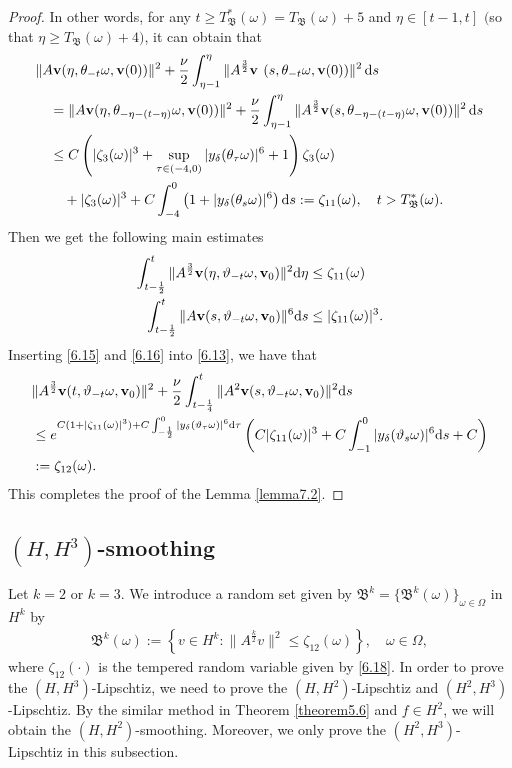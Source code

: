 \documentclass{elsarticle}
\theoremstyle{definition}
\numberwithin{equation}{section}
\renewcommand{\d}{{\rm{d}}}
\begin{document}
\begin{proof}
 In other words,  for any  $t\geq T_{\mathfrak B}^* (\omega)= T_{\mathfrak B} (\omega) +5$ and $\eta\in [t-1,t ]$ $($so that $\eta\geq T_{\mathfrak B} (\omega)+4)$, it can obtain that
\begin{align*}
& \|A\textbf{v} (\eta ,\theta_{-t } \omega, \textbf{v}(0)) \|^2 + \frac{\nu}{2} \int_{\eta-1}^\eta  \|A^{\frac32}\textbf{v } (s,\theta_{-t} \omega, \textbf{v}(0)) \|^2 \, \d s\\
  & \quad =  \|A\textbf{v} (\eta ,\theta_{-\eta-(t-\eta) } \omega, \textbf{v}(0)) \|^2
  + \frac{\nu}{2}  \int_{\eta-1}^\eta  \|A^{\frac32}\textbf{v} (s,\theta_{-\eta-(t-\eta)} \omega, \textbf{v}(0)) \|^2 \, \d s \\
&\quad \leq  C\left (  |\zeta_3(\omega)|^3+ \sup_{\tau\in (-4,0)}|y_\delta(\theta_\tau\omega)|^6+1\right) \zeta_3(\omega) \nonumber\\
&\qquad+ |\zeta_3(\omega)|^3+ C\int^{0}_{-4}    \left(1 +|y_\delta(\theta_s\omega)|^6 \right)   \d s:=\zeta_{11}(\omega),\quad t>T_{\mathfrak B}^* (\omega) .
\end{align*}
Then we get the following main estimates
\begin{align}
\int_{t-\frac{1}{2}}^{t}\|A^\frac{3}{2}\textbf{v}(\eta,\vartheta_{-t}\omega,\textbf{v}_0)\|^2\d \eta&\leq \zeta_{11}(\omega)\label{6.15}\\
\int_{t-\frac{1}{2}}^t\|A\textbf{v}(s,\vartheta_{-t}\omega,\textbf{v}_0)\|^6 \d s&\leq |\zeta_{11}(\omega)|^3.\label{6.16}
\end{align}
Inserting \eqref{6.15} and \eqref{6.16} into \eqref{6.13}, we have that
\begin{align}\label{6.18}
&\|A^\frac{3}{2}\textbf{v}(t,\vartheta_{-t}\omega,\textbf{v}_0)\|^2+\frac{\nu}{2}\int_{t-\frac{1}{4}}^t
\|A^2\textbf{v}(s,\vartheta_{-t}\omega,\textbf{v}_0)\|^2 \d s\nonumber\\
&\leq
e^{C
(1+|\zeta_{11}(\omega)|^3)+C
\int_{-\frac{1}{2}}^0
|y_\delta(\vartheta_\tau\omega)|^6 \d\tau}\left(C|\zeta_{11}(\omega)|^3+C\int_{-1}^0
|y_\delta(\vartheta_{s}\omega)|^6\d s+C\right)\nonumber\\
&:=\zeta_{12}(\omega).
\end{align}
This completes the proof of the Lemma \ref{lemma7.2}.
\end{proof}
\subsection{$(H, H^3)$-smoothing}

Let $k=2$ or $k=3$. We introduce a random set given by
$\mathfrak{B}^{k}=\{\mathfrak{B}^k(\omega)\}_{\omega\in\Omega}$ in $H^k$  by
\begin{align}
\mathfrak{B}^{k}(\omega):= \left \{ v \in H^k:\|A^{\frac k2}v\|^2\leq \zeta_{12}(\omega)
\right \}, \quad \omega\in\Omega,
\end{align}
where $\zeta_{12}(\cdot)$ is the tempered random variable given by \eqref{6.18}. In order to prove the $( H, H^{3})$-Lipschtiz, we  need to prove the $( H, H^{2})$-Lipschtiz and $(H^2, H^{3})$-Lipschtiz. By the similar method in Theorem \ref{theorem5.6} and $f\in H^2$, we will obtain the $(H, H^2)$-smoothing. Moreover, we only prove the $(H^2, H^{3})$-Lipschtiz in this subsection.
\end{document}

